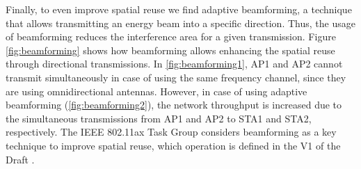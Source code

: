 \documentclass[12pt, a4paper,twoside]{tesi_upf}
\begin{document}
			Finally, to even improve spatial reuse we find adaptive beamforming, a technique that allows transmitting an energy beam into a specific direction. Thus, the usage of beamforming reduces the interference area for a given transmission. Figure \ref{fig:beamforming} shows how beamforming allows enhancing the spatial reuse through directional transmissions. In \ref{fig:beamforming1}, AP1 and AP2 cannot transmit simultaneously in case of using the same frequency channel, since they are using omnidirectional antennas. However, in case of using adaptive beamforming (\ref{fig:beamforming2}), the network throughput is increased due to the simultaneous transmissions from AP1 and AP2 to STA1 and STA2, respectively. The IEEE 802.11ax Task Group considers beamforming as a key technique to improve spatial reuse, which operation is defined in the V1 of the Draft \cite{tgax2016draft}. 
\end{document}
